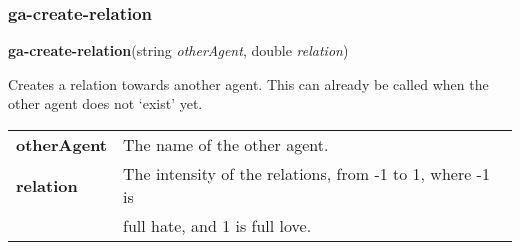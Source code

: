 \subsubsection{ga-create-relation}

\textbf{ga-create-relation}(string \emph{otherAgent}, double \emph{relation})

Creates a relation towards another agent. This can already be called when the other agent does not `exist' yet. \\

\begin{tabular}{l l}
	\textbf{otherAgent} & The name of the other agent.\\
	\textbf{relation} & The intensity of the relations, from -1 to 1, where -1 is \\
	& full hate, and 1 is full love.\\
\end{tabular}
